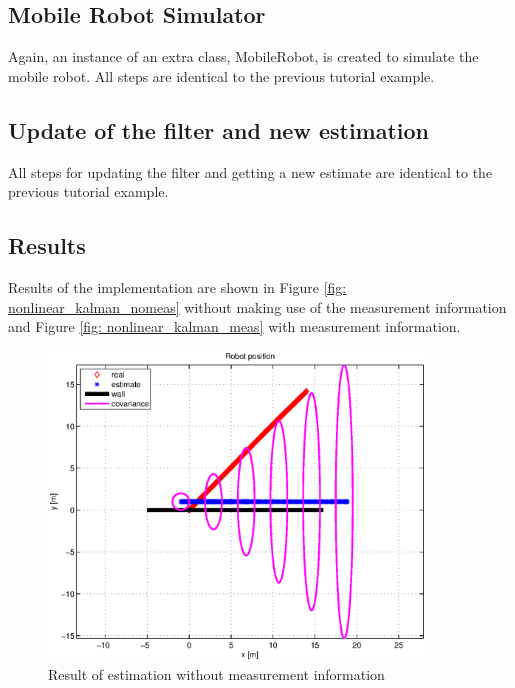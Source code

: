\documentclass[a4paper,10pt]{report}
\begin{document}
\subsection{Mobile Robot Simulator}
Again, an instance of an extra class, MobileRobot, is created to
simulate the mobile robot. All steps are identical to the previous
tutorial example.


\subsection{Update of the filter and new estimation}
All steps for updating the filter and getting a new estimate are
identical to the previous tutorial example.


\subsection{Results}
Results of the implementation are shown in Figure \ref{fig:
  nonlinear_kalman_nomeas} without making use of the measurement
information and Figure \ref{fig: nonlinear_kalman_meas} with
measurement information.
\begin{figure}
\center
\includegraphics[width=10cm]{robot_nonlinearkalman_nomeas.eps}
\caption{Result of estimation without measurement information}
\label{fig: nonlinear_kalman_nomeas}
\end{figure}
\end{document}
